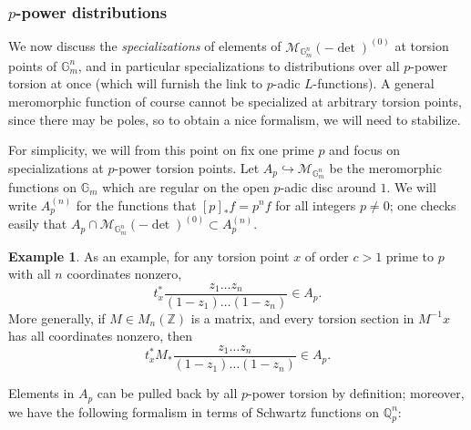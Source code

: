 \documentclass[10pt]{amsart}
\theoremstyle{definition}
\newtheorem{ex}[thm]{Example}
\newcommand{\Z}{\mathbb{Z}}
\newcommand{\Q}{\mathbb{Q}}
\newcommand{\G}{\mathbb{G}}
\numberwithin{equation}{section}
\begin{document}
    \subsubsection{$p$-power distributions} \label{section:fourier}

    We now discuss the \emph{specializations} of elements of $\mathcal{M}_{\G_m^n}(-\det)^{(0)}$ at torsion points of $\G_m^n$, and in particular specializations to distributions over all $p$-power torsion at once (which will furnish the link to $p$-adic $L$-functions). A general meromorphic function of course cannot be specialized at arbitrary torsion points, since there may be poles, so to obtain a nice formalism, we will need to stabilize.
    
    For simplicity, we will from this point on fix one prime $p$ and focus on specializations at $p$-power torsion points. Let $A_p\hookrightarrow \mathcal{M}_{\mathbb{G}_m^n}$ be the meromorphic functions on $\G_m$ which are regular on the open $p$-adic disc around $1$. We will write $A_p^{(n)}$ for the functions that $[p]_*f = p^nf$ for all integers $p\ne 0$; one checks easily that $A_p \cap \mathcal{M}_{\mathbb{G}_m^n}(-\det)^{(0)}\subset A_p^{(n)}$. 

    \begin{ex}
    As an example, for any torsion point $x$ of order $c>1$ prime to $p$ with all $n$ coordinates nonzero, 
    \[
    t_x^* \frac{z_1\ldots z_n}{(1-z_1)\ldots (1-z_n)}\in A_p.
    \]
    More generally, if $M\in M_n(\Z)$ is a matrix, and every torsion section in $M^{-1}x$ has all coordinates nonzero, then
    \[
    t_x^* M_*\frac{z_1\ldots z_n}{(1-z_1)\ldots (1-z_n)}\in A_p.
    \]
    \end{ex}

    Elements in $A_p$ can be pulled back by all $p$-power torsion by definition; moreover, we have the following formalism in terms of Schwartz functions on $\Q_p^n$:
\end{document}
